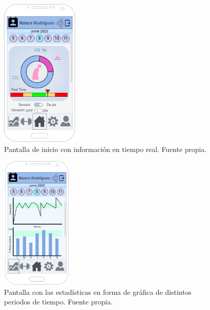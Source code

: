 \begin{figure}[h]
    \centering
    \includegraphics[width=0.33\textwidth]{img/PantallaInicio.png}
    \caption{Pantalla de inicio con información en tiempo real. Fuente propia.}
    \label{fig:inicio} 
\end{figure}

\begin{figure}[h]
    \centering
    \includegraphics[width=0.3\textwidth]{img/Estadisticas.png}
    \caption{Pantalla con las estadísticas en forma de gráfica de distintos periodos de tiempo. Fuente propia.}
    \label{fig:estadisticas} 
\end{figure}

